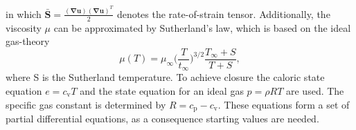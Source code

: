 \documentclass[11pt,a4paper,openany,oneside,parskip=half*]{article}
\renewcommand*\vec[1]{\boldsymbol{#1}}
\renewcommand*\matrix[1]{\boldsymbol{#1}}
\begin{document}
in which $ \matrix{\bar{S}} = \frac{(\vec\nabla \vec{u})(\vec\nabla \vec{u})^T}{2} $ denotes the rate-of-strain tensor. Additionally, the viscosity
$ \mu $ can be approximated by Sutherland's law, which is based on the ideal gas-theory
\begin{equation}
 \mu (T) = \mu_\infty \biggl(\frac{T}{t_\infty}\biggl)^{3/2} \frac{T_\infty + S}{T + S},
\end{equation}
where S is the Sutherland temperature.
To achieve closure the caloric state equation $ e = c_\mathrm{v} T $ and the state equation for an ideal gas $
p = \rho R T $ are used. The specific gas constant is determined by $ R = c_\mathrm{p} - c_\mathrm{v} $. 
These equations form a set of partial differential equations, as a consequence starting values are needed.
\pagebreak
\end{document}
